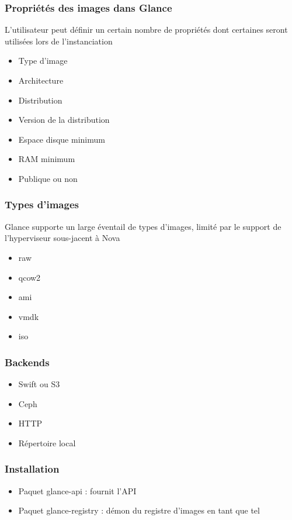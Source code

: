   \begin{frame}
    \frametitle{Propriétés des images dans Glance}
    L'utilisateur peut définir un certain nombre de propriétés dont certaines seront utilisées lors de l'instanciation
    \begin{itemize}
      \item Type d'image
      \item Architecture
      \item Distribution
      \item Version de la distribution
      \item Espace disque minimum
      \item RAM minimum
      \item Publique ou non
    \end{itemize}
  \end{frame}

  \begin{frame}
    \frametitle{Types d'images}
    Glance supporte un large éventail de types d'images, limité par le support de l'hyperviseur sous-jacent à Nova
    \begin{itemize}
      \item raw
      \item qcow2
      \item ami
      \item vmdk
      \item iso
    \end{itemize}
  \end{frame}

  \begin{frame}
    \frametitle{Backends}
    \begin{itemize}
      \item Swift ou S3
      \item Ceph
      \item HTTP
      \item Répertoire local
    \end{itemize}
  \end{frame}

  \begin{frame}
    \frametitle{Installation}
    \begin{itemize}
      \item Paquet glance-api : fournit l'API
      \item Paquet glance-registry : démon du registre d'images en tant que tel
    \end{itemize}
  \end{frame}

